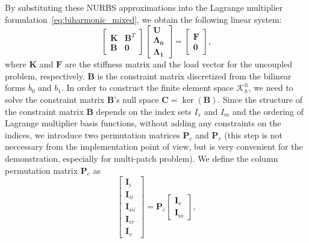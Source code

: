 \documentclass[preprint,12pt]{elsarticle}
\theoremstyle{remark}
\begin{document}
By substituting these NURBS approximations into the Lagrange multiplier formulation~\eqref{eq:biharmonic_mixed}, we obtain the following linear system:
\begin{equation}
    \begin{bmatrix}
        \mathbf{K} & \mathbf{B}^T\\
        \mathbf{B} & \mathbf{0}
    \end{bmatrix}
    \begin{bmatrix}
        \mathbf{U}\\
        \mathbf{\Lambda_0}\\
        \mathbf{\Lambda_1}
    \end{bmatrix}=
    \begin{bmatrix}
        \mathbf{F}\\
        \mathbf{0}
    \end{bmatrix},\label{eq:lagrange_multiplier_dicretize}
\end{equation}
where $\mathbf{K}$ and $\mathbf{F}$ are the stiffness matrix and the load vector for the uncoupled problem, respectively. $\mathbf{B}$ is the constraint matrix discretized from the bilinear forms $b_0$ and $b_1$. In order to construct the finite element space $\mathcal{K}_b^h$, we need to solve the constraint matrix $\mathbf{B}$'s null space $\mathbf{C}=\ker(\mathbf{B})$. Since the structure of the constraint matrix $\mathbf{B}$ depends on the index sets $I_s$ and $I_m$ and the ordering of Lagrange multiplier basis functions, without adding any constraints on the indices, we introduce two permutation matrices $\mathbf{P}_c$ and $\mathbf{P}_r$ (this step is not neccessary from the implementation point of view, but is very convenient for the demonstration, especially for multi-patch problem). We define the column permutation matrix $\mathbf{P}_c$ as
\begin{equation}
    \begin{bmatrix}
        \mathbf{I}_{i}\\
        \mathbf{I}_{ii}\\
        \mathbf{I}_{iii}\\
        \mathbf{I}_{iv}\\
        \mathbf{I}_{v}
    \end{bmatrix}=
    \mathbf{P}_c
    \begin{bmatrix}
        \mathbf{I}_s\\
        \mathbf{I}_m
    \end{bmatrix},
\end{equation}
\end{document}
